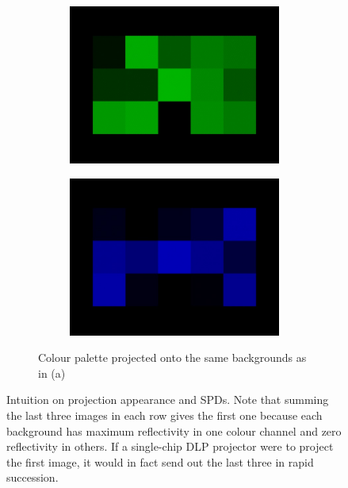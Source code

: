 \begin{figure}
\begin{subfigure}{\textwidth}
\begin{subfigure}{0.24\textwidth}
            \includegraphics[width=\textwidth]{images/02-spd_intuition-palette_green.jpg}
        \end{subfigure}
        \hfill
        \begin{subfigure}{0.24\textwidth}
            \centering
            \includegraphics[width=\textwidth]{images/02-spd_intuition-palette_blue.jpg}
        \end{subfigure}
        \caption{Colour palette projected onto the same backgrounds as in (a)}
    \end{subfigure}
    \caption{Intuition on projection appearance and SPDs. Note that summing the last three images in each row gives the first one because each background has maximum reflectivity in one colour channel and zero reflectivity in others. If a single-chip DLP projector were to project the first image, it would in fact send out the last three in rapid succession.}
    \label{fig:background_spd_intuition}
\end{figure}

